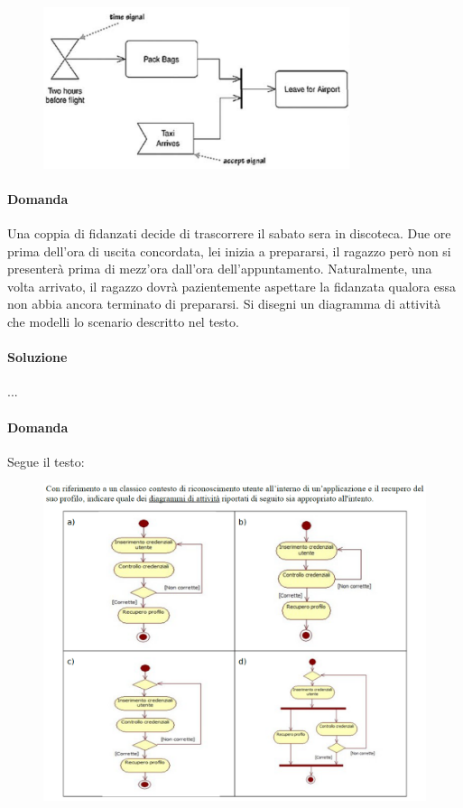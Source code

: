 \begin{figure}[H]\center
\includegraphics[width=0.8\textwidth]{res/img/Esercizi/sol-aeroporto}
\end{figure}

\paragraph{Domanda} 

Una coppia di fidanzati decide di trascorrere il sabato sera in discoteca. Due ore prima dell'ora di uscita concordata, lei
inizia a prepararsi, il ragazzo però non si presenterà prima di mezz'ora dall'ora dell'appuntamento. Naturalmente, una
volta arrivato, il ragazzo dovrà pazientemente aspettare la fidanzata qualora essa non abbia ancora terminato di prepararsi.
Si disegni un diagramma di attività che modelli lo scenario descritto nel testo.

\paragraph{Soluzione} ...

\paragraph{Domanda} Segue il testo:

\begin{figure}[H]\center
\includegraphics[width=1\textwidth]{res/img/Esercizi/es-diagrammaAttivita}
\end{figure}

